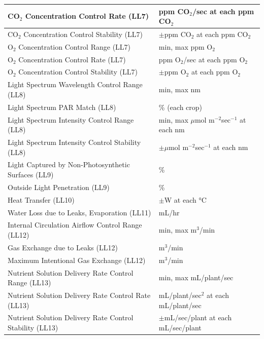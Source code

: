 \documentclass{report}
\newcounter{metricnumber}
\newcommand\rownumber{\stepcounter{metricnumber}\arabic{metricnumber}}
\begin{document}
\begin{tabular}{| @{\makebox[2em][l]{\rownumber}} | l | l |}
    \hline
    CO${}_2$ Concentration Control Rate \hfill (LL7) & ppm CO${}_2$/sec at each ppm 
    CO${}_2$ \\
    \hline
    CO${}_2$ Concentration Control Stability \hfill (LL7) & $\pm$ppm CO${}_2$ at 
    each ppm CO${}_2$ \\
    \hline
    O${}_2$ Concentration Control Range \hfill (LL7) & min, max ppm O${}_2$ \\
    \hline
    O${}_2$ Concentration Control Rate \hfill (LL7) & ppm O${}_2$/sec at each ppm 
    O${}_2$  \\
    \hline
    O${}_2$ Concentration Control Stability \hfill (LL7) & $\pm$ppm O${}_2$ at each 
    ppm O${}_2$ \\
    \hline
    Light Spectrum Wavelength Control Range \hfill (LL8) & min, max nm \\
    \hline
    Light Spectrum PAR Match \hfill (LL8) & \% (each crop) \\
    \hline
    Light Spectrum Intensity Control Range \hfill (LL8) & min, max $\mu$mol 
    m${}^{-2}$sec${}^{-1}$ at each nm \\
    \hline
    Light Spectrum Intensity Control Stability \hfill (LL8) & $\pm\mu$mol 
    m${}^{-2}$sec${}^{-1}$ at each nm \\
    \hline
    Light Captured by Non-Photosynthetic Surfaces \hfill (LL9) & \% \\
    \hline
    Outside Light Penetration \hfill (LL9) & \% \\
    \hline
    Heat Transfer \hfill (LL10) & $\pm$W at each °C \\
    \hline
    Water Loss due to Leaks, Evaporation \hfill (LL11) & mL/hr \\
    \hline
    Internal Circulation Airflow Control Range \hfill (LL12) & min, max m${}^3$/min \\
    \hline
    Gas Exchange due to Leaks \hfill (LL12) & m${}^3$/min \\
    \hline
    Maximum Intentional Gas Exchange \hfill (LL12) & m${}^3$/min \\
    \hline
    Nutrient Solution Delivery Rate Control Range \hfill (LL13) & min, max 
    mL/plant/sec \\
    \hline
    Nutrient Solution Delivery Rate Control Rate \hfill (LL13) & mL/plant/sec${}^2$ at each mL/plant/sec  \\
    \hline
    Nutrient Solution Delivery Rate Control Stability \hfill (LL13) & 
    $\pm$mL/sec/plant at each mL/sec/plant \\
    \hline
\end{tabular}
\newpage
\end{document}
